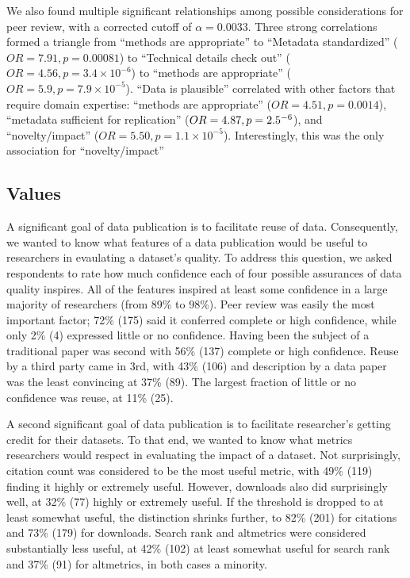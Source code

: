 \documentclass[10pt]{article}
\begin{document}
We also found multiple significant relationships among possible considerations for peer review, with a corrected cutoff of $\alpha=0.0033$.
Three strong correlations formed a triangle from ``methods are appropriate'' to ``Metadata standardized'' ($OR=7.91, p=0.00081$) to ``Technical details check out'' ($OR=4.56, p=3.4\times10^{-6}$) to ``methods are appropriate'' ($OR=5.9, p=7.9\times10^{-5}$).
``Data is plausible'' correlated with other factors that require domain expertise: ``methods are appropriate'' ($OR=4.51, p=0.0014$), ``metadata sufficient for replication'' ($OR=4.87, p=2.5\time10^{-6}$), and ``novelty/impact'' ($OR=5.50, p=1.1\times10^{-5}$).
Interestingly, this was the only association for ``novelty/impact''

\subsection*{Values}

A significant goal of data publication is to facilitate reuse of data.
Consequently, we wanted to know what features of a data publication would be useful to researchers in evaulating a dataset's quality.
To address this question, we asked respondents to rate how much confidence each of four possible assurances of data quality inspires.
All of the features inspired at least some confidence in a large majority of researchers (from 89\% to 98\%).
Peer review was easily the most important factor; 72\% (175) said it conferred complete or high confidence, while only 2\% (4) expressed little or no confidence.
Having been the subject of a traditional paper was second with 56\% (137) complete or high confidence.
Reuse by a third party came in 3rd, with 43\% (106) and description by a data paper was the least convincing at 37\% (89).
The largest fraction of little or no confidence was reuse, at 11\% (25).

A second significant goal of data publication is to facilitate researcher's getting credit for their datasets.
To that end, we wanted to know what metrics researchers would respect in evaluating the impact of a dataset.
Not surprisingly, citation count was considered to be the most useful metric, with 49\% (119) finding it highly or extremely useful. 
However, downloads also did surprisingly well, at 32\% (77) highly or extremely useful.
If the threshold is dropped to at least somewhat useful, the distinction shrinks further, to 82\% (201) for citations and 73\% (179) for downloads.
Search rank and altmetrics were considered substantially less useful, at 42\% (102) at least somewhat useful for search rank and 37\% (91) for altmetrics, in both cases a minority.
\end{document}
